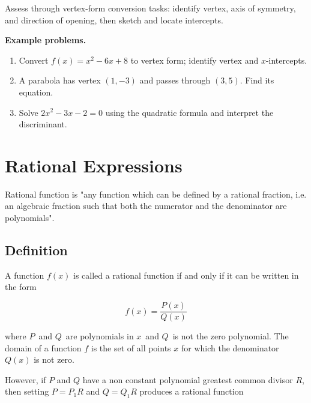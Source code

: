 Assess through vertex-form conversion tasks: identify vertex, axis of
symmetry, and direction of opening, then sketch and locate intercepts.

\textbf{Example problems.}
\begin{enumerate}
    \item Convert $f(x)=x^2-6x+8$ to vertex form; identify vertex and
          $x$-intercepts.
    \item A parabola has vertex $(1,-3)$ and passes through $(3,5)$.
          Find its equation.
    \item Solve $2x^2-3x-2=0$ using the quadratic formula and interpret
          the discriminant.
\end{enumerate}



\section{Rational Expressions}
\label{sec:rati-e460}


Rational function is "any function which can be defined by a rational fraction, i.e. an
algebraic fraction such that both the numerator and the denominator are polynomials".




\subsection{Definition}
\label{sss:defi-3061}




A function $f(x)$ is called a rational function if and only if it can be written in the form



$$f(x) = \frac{P(x)}{Q(x)}$$



where $P\,$ and $Q\,$ are polynomials in $x\,$ and $Q\,$ is not the zero polynomial. The
domain of a function $f$ is the set of all points $x$ for which the
denominator $Q(x)$ is not zero.



However, if $\textstyle P$ and $\textstyle Q$ have a non constant polynomial greatest
common divisor $\textstyle R$, then setting $\textstyle P=P _1R$ and $\textstyle Q=Q _1R$
produces a rational function



